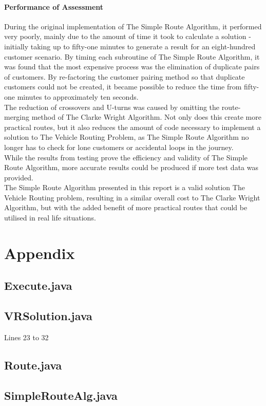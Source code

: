 \documentclass[conference]{acmsiggraph}
\begin{document}
		\paragraph{Performance of Assessment}
		During the original implementation of The Simple Route Algorithm, it performed very poorly, mainly due to the amount of time it took to calculate a solution - initially taking up to fifty-one minutes to generate a result for an eight-hundred customer scenario. By timing each subroutine of The Simple Route Algorithm, it was found that the most expensive process was the elimination of duplicate pairs of customers. By re-factoring the customer pairing method so that duplicate customers could not be created, it became possible to reduce the time from fifty-one minutes to approximately ten seconds.\\
		The reduction of crossovers and U-turns was caused by omitting the route-merging method of The Clarke Wright Algorithm. Not only does this create more practical routes, but it also reduces the amount of code necessary to implement a solution to The Vehicle Routing Problem, as The Simple Route Algorithm no longer has to check for lone customers or accidental loops in the journey.\\
		While the results from testing prove the efficiency and validity of The Simple Route Algorithm, more accurate results could be produced if more test data was provided.\\
		The Simple Route Algorithm presented in this report is a valid solution The Vehicle Routing problem, resulting in a similar overall cost to The Clarke Wright Algorithm, but with the added benefit of more practical routes that could be utilised in real life situations.
		 	
	\section{Appendix}
	
		\subsection{Execute.java}
		

		\subsection{VRSolution.java}
		Lines 23 to 32
		
		
		\subsection{Route.java}
		
		
		\subsection{SimpleRouteAlg.java}
		
		
		
		
		
			
\end{document}
